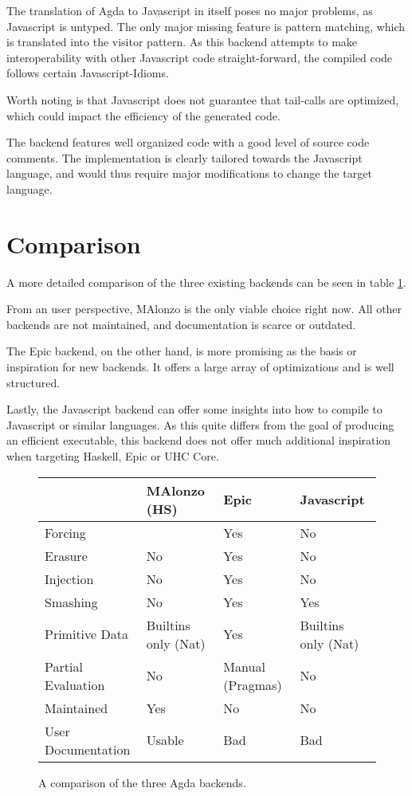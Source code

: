 \documentclass[12pt, a4paper, twoside]{report}
\begin{document}
The translation of Agda to Javascript in itself poses no major problems, as Javascript is untyped. The
only major missing feature is pattern matching, which is translated into the visitor pattern.
As this backend attempts to make interoperability
with other Javascript code straight-forward, the compiled code follows certain Javascript-Idioms.

Worth noting is that Javascript does not guarantee that tail-calls are optimized, which could impact
the efficiency of the generated code.

The backend features well organized code with a good level of source code comments. The implementation
is clearly tailored towards the Javascript language, and would thus require major modifications to change the
target language.


\section{Comparison}
A more detailed comparison of the three existing backends can be seen in table \ref{tbl:backends-comp}.

From an user perspective, MAlonzo is the only viable choice right now. All other backends
are not maintained, and documentation is scarce or outdated.

The Epic backend, on the other hand, is more promising as the basis or inspiration for new backends.
It offers a large array of optimizations and is well structured.

Lastly, the Javascript backend can offer some insights into how to
compile to Javascript or similar languages. As this quite differs from
the goal of producing an efficient executable, this backend does not offer much
additional inspiration when targeting Haskell, Epic or UHC Core.

\begin{figure}
\begin{tabular}{l | l | l | l}
& MAlonzo (HS) & Epic & Javascript \\
\hline
Forcing & & Yes & No \\
Erasure & No & Yes & No \\
Injection & No & Yes & No \\
Smashing & No & Yes & Yes \\
Primitive Data & Builtins only (Nat) & Yes & Builtins only (Nat) \\
Partial Evaluation & No & Manual (Pragmas) & No \\
\hline
Maintained & Yes & No & No \\
User Documentation & Usable & Bad & Bad \\
\hline
\end{tabular}
\caption{A comparison of the three Agda backends.}
\label{tbl:backends-comp}
\end{figure}
\end{document}
